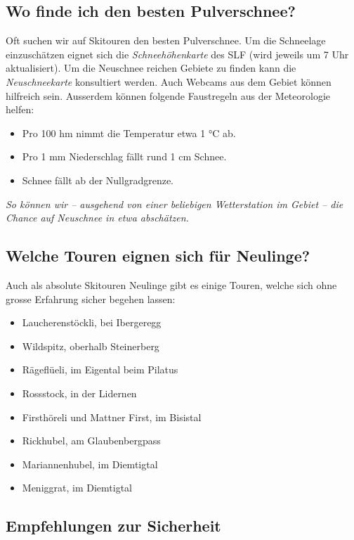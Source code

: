 \subsection{Wo finde ich den besten Pulverschnee?}

Oft suchen wir auf Skitouren den besten Pulverschnee.
Um die Schneelage einzuschätzen eignet sich die \textit{Schneehöhenkarte} des SLF (wird jeweils um 7 Uhr aktualisiert).
Um die Neuschnee reichen Gebiete zu finden kann die \textit{Neuschneekarte} konsultiert werden.
Auch Webcams aus dem Gebiet können hilfreich sein.
Ausserdem können folgende Faustregeln aus der Meteorologie helfen:

\begin{itemize}
  \item{Pro 100 hm nimmt die Temperatur etwa 1 °C ab.}
  \item{Pro 1 mm Niederschlag fällt rund 1 cm Schnee.}
  \item{Schnee fällt ab der Nullgradgrenze.}
\end{itemize}

\textit{So können wir -- ausgehend von einer beliebigen Wetterstation im Gebiet -- die Chance auf Neuschnee in etwa abschätzen.}

\newcolumn

\subsection{Welche Touren eignen sich für Neulinge?}

Auch als absolute Skitouren Neulinge gibt es einige Touren, welche sich ohne grosse Erfahrung sicher begehen lassen:

\begin{itemize}
  \item{Laucherenstöckli, bei Ibergeregg}
  \item{Wildspitz, oberhalb Steinerberg}
  \item{Rägeflüeli, im Eigental beim Pilatus}
  \item{Rossstock, in der Lidernen}
  \item{Firsthöreli und Mattner First, im Bisistal}
  \item{Rickhubel, am Glaubenbergpass}
  \item{Mariannenhubel, im Diemtigtal}
  \item{Meniggrat, im Diemtigtal}
\end{itemize}

\subsection{Empfehlungen zur Sicherheit}

